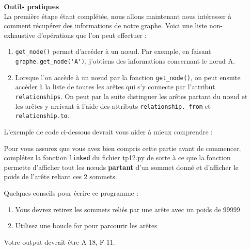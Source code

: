 \begin{Exercice}[10 minutes]\textbf{Outils pratiques}\\
    La première étape étant complétée, nous allons maintenant nous intéresser à comment récupérer des informations de notre graphe. Voici une liste non-exhaustive d'opérations que l'on peut effectuer :\\
    \begin{enumerate}
        \item \lstinline{get_node()} permet d'accéder à un nœud. Par exemple, en faisant \lstinline{graphe.get_node('A')}, j'obtiens des informations concernant le nœud A.
        \item Lorsque l'on accède à un nœud par la fonction \lstinline{get_node()}, on peut ensuite accéder à la liste de toutes les arêtes qui s'y connecte par l'attribut \lstinline{relationships}. On peut par la suite distinguer les arêtes partant du nœud et les arêtes y arrivant à l'aide des attributs \lstinline{relationship._from} et \lstinline{relationship.to}.
    \end{enumerate}
    
    L'exemple de code ci-dessous devrait vous aider à mieux comprendre :
    
    
    Pour vous assurez que vous avez bien compris cette partie avant de commencer, complétez la fonction \lstinline{linked} du fichier tp12.py de sorte à ce que la fonction permette d'afficher tout les nœuds \textbf{partant} d'un sommet donné et d'afficher le poids de l'arête reliant ces 2 sommets.\\
    
    
    \begin{conseil}
        Quelques conseils pour écrire ce programme :
        \begin{enumerate}
            \item Vous devrez retirez les sommets reliés par une arête avec un poids de 99999
            \item Utilisez une boucle for pour parcourir les arêtes
        \end{enumerate}
    Votre output devrait être A 18, F 11.
    \end{conseil}
    \begin{solution}
        
    \end{solution}
\end{Exercice}
\newpage

